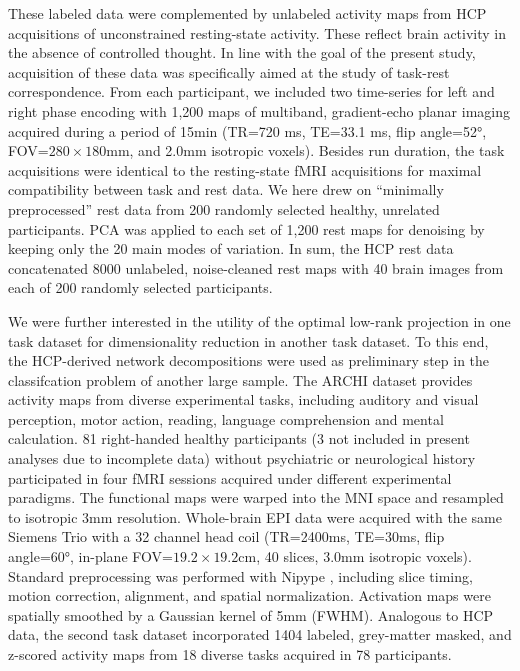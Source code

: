 \documentclass{article} %
\begin{document}
These labeled data were complemented by unlabeled activity maps
from HCP acquisitions of unconstrained resting-state activity.
These reflect brain activity in the absence of controlled thought.
In line with the goal of the present study, acquisition of these data was
specifically aimed at the study of task-rest correspondence.
From each participant, we included two
time-series for left and right phase encoding
with 1,200 maps of multiband, gradient-echo planar imaging acquired
during a period of 15min (TR=720 ms, TE=33.1 ms, flip angle=52°,
FOV=$280\times180$mm, and 2.0mm isotropic voxels). Besides run duration,
the task acquisitions were identical to the resting-state fMRI acquisitions
for maximal compatibility between task and rest data.
We here drew on ``minimally preprocessed'' rest data
from 200 randomly selected healthy, unrelated participants.
PCA was applied to each set of 1,200 rest maps for
denoising by keeping only the 20 main modes of
variation.
In sum, the HCP rest data concatenated
8000 unlabeled, noise-cleaned rest maps with
40 brain images from each of 200 randomly selected participants.

We were further interested in the utility of the optimal low-rank projection
in one task dataset for dimensionality reduction in another task dataset.
To this end, the HCP-derived network decompositions were used as preliminary
step in the classifcation problem of another large sample.
The ARCHI dataset \cite{pinel07} provides activity maps from
diverse experimental tasks, including auditory and visual perception, motor action,
reading, language comprehension and mental calculation.
81 right-handed healthy participants
(3 not included in present analyses due to incomplete data)
without psychiatric or
neurological history participated in four fMRI sessions acquired under
different experimental paradigms.
The functional maps were warped into
the MNI space and resampled to isotropic 3mm resolution.
Whole-brain EPI data were acquired with the same Siemens Trio with a 32
channel head coil (TR=2400ms, TE=30ms, flip angle=60°, in-plane
FOV=$19.2\times19.2$cm, 40 slices, 3.0mm isotropic voxels).
Standard preprocessing was performed with Nipype \cite{gorgo11}, including
slice timing, motion correction, alignment, and spatial normalization.
Activation maps were spatially smoothed by
a Gaussian kernel of 5mm (FWHM).
Analogous to HCP data, the second task dataset incorporated 1404
labeled, grey-matter masked, and z-scored activity maps
from 18 diverse tasks acquired in 78 participants.
\end{document}

